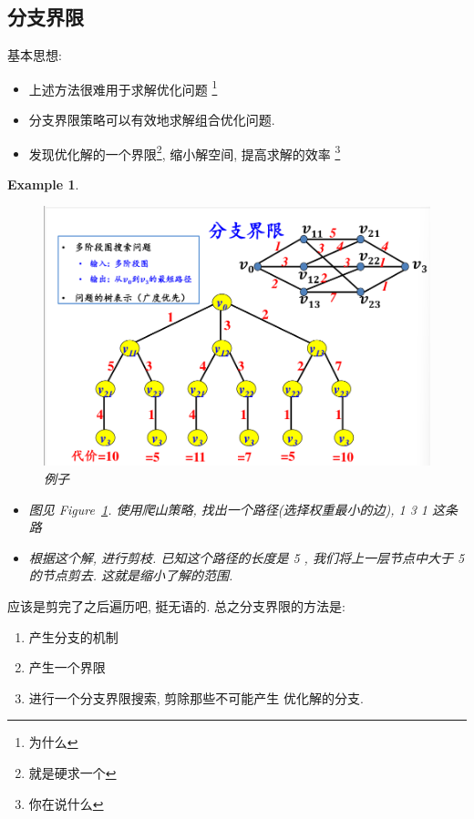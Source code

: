 \documentclass[a4paper, 10pt]{ctexart} %
\newtheorem{example}{Example}
\begin{document}
\subsection{分支界限}
基本思想: 
\begin{itemize}
    \item 上述方法很难用于求解优化问题 \footnote{为什么}
    \item 分支界限策略可以有效地求解组合优化问题. 
    \item 发现优化解的一个界限\footnote{就是硬求一个}, 缩小解空间, 提高求解的效率 \footnote{你在说什么}
\end{itemize}
\begin{example}
\begin{figure}[H]
    \centering
    \includegraphics[scale=0.5]{ss1.png}
    \caption{例子}
    \label{tu6}
\end{figure}
\begin{itemize} 
    \item[1.] 图见 Figure~\ref{tu6}. 使用爬山策略, 找出一个路径(选择权重最小的边), 1 3 1 这条路
    \item[2.] 根据这个解, 进行剪枝. 已知这个路径的长度是 5 , 我们将上一层节点中大于 5 的节点剪去. 这就是缩小了解的范围.  
\end{itemize}
\end{example}
应该是剪完了之后遍历吧, 挺无语的. 总之分支界限的方法是:
\begin{enumerate}
    \item 产生分支的机制
    \item 产生一个界限
    \item 进行一个分支界限搜索, 
    剪除那些不可能产生
    优化解的分支.
\end{enumerate}
\end{document}
